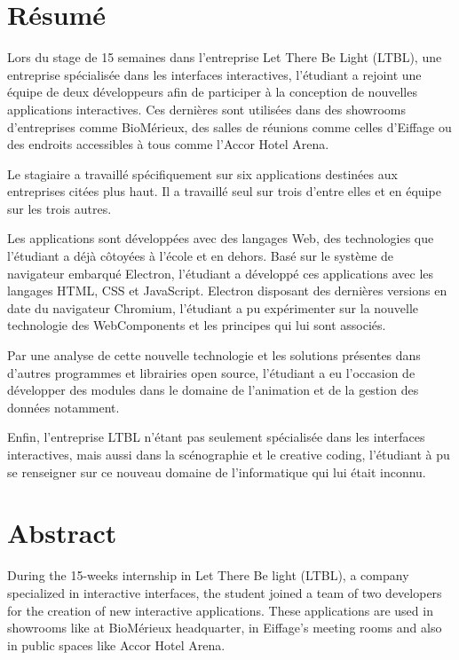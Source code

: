 \documentclass{article}
\begin{document}
    \section*{Résumé}

    Lors du stage de 15 semaines dans l'entreprise Let There Be Light (LTBL), une entreprise spécialisée dans les interfaces interactives, l'étudiant a rejoint une équipe de deux développeurs afin de participer à la conception de nouvelles applications interactives.
    Ces dernières sont utilisées dans des showrooms d'entreprises comme BioMérieux, des salles de réunions comme celles d'Eiffage ou des endroits accessibles à tous comme l'Accor Hotel Arena.

    Le stagiaire a travaillé spécifiquement sur six applications destinées aux entreprises citées plus haut.
    Il a travaillé seul sur trois d'entre elles et en équipe sur les trois autres.

    Les applications sont développées avec des langages Web, des technologies que l'étudiant a déjà côtoyées à l'école et en dehors.
    Basé sur le système de navigateur embarqué Electron, l'étudiant a développé ces applications avec les langages HTML, CSS et JavaScript.
    Electron disposant des dernières versions en date du navigateur Chromium, l'étudiant a pu expérimenter sur la nouvelle technologie des WebComponents et les principes qui lui sont associés.

    Par une analyse de cette nouvelle technologie et les solutions présentes dans d'autres programmes et librairies open source, l'étudiant a eu l'occasion de développer des modules dans le domaine de l'animation et de la gestion des données notamment.

    Enfin, l'entreprise LTBL n'étant pas seulement spécialisée dans les interfaces interactives, mais aussi dans la scénographie et le creative coding,
    l'étudiant à pu se renseigner sur ce nouveau domaine de l'informatique qui lui était inconnu.

    \section*{Abstract}

    During the 15-weeks internship in Let There Be light (LTBL), a company specialized in interactive interfaces, the student joined a team of two developers for the creation of new interactive applications.
    These applications are used in showrooms like at BioMérieux headquarter, in Eiffage's meeting rooms and also in public spaces like Accor Hotel Arena.
\end{document}
